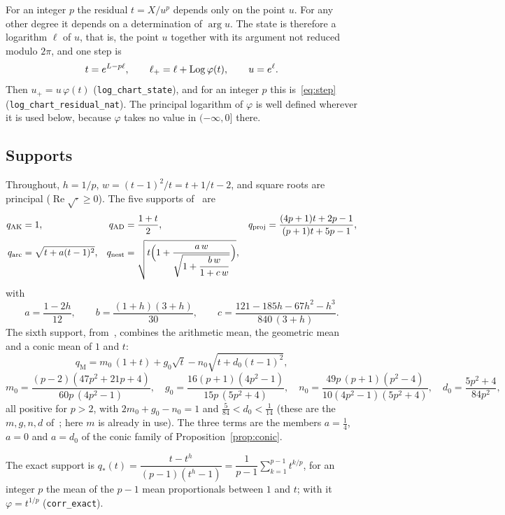 \documentclass[10pt,a4paper]{article}
\theoremstyle{plain}
\theoremstyle{remark}
\numberwithin{equation}{section}
\DeclareMathOperator{\re}{Re}\DeclareMathOperator{\im}{Im}
\newcommand{\lean}[1]{\texttt{#1}}
\begin{document}
For an integer $p$ the residual $t=X/u^{p}$ depends only on the point $u$. For any other degree it
depends on a determination of $\arg u$. The state is therefore a logarithm $\ell$ of $u$, that is,
the point $u$ together with its argument not reduced modulo $2\pi$, and one step is
\begin{equation}\label{eq:logstep}
  t=e^{L-p\ell},\qquad \ell_{+}=\ell+\operatorname{Log}\varphi(t),\qquad u=e^{\ell}.
\end{equation}
Then $u_+=u\,\varphi(t)$ (\lean{log\_chart\_state}), and for an integer $p$ this
is~\eqref{eq:step} (\lean{log\_chart\_residual\_nat}). The principal logarithm of $\varphi$ is
well defined wherever it is used below, because $\varphi$ takes no value in $(-\infty,0]$ there.

\subsection{Supports}

Throughout, $h=1/p$, $w=(t-1)^{2}/t=t+1/t-2$, and square roots are principal ($\re\sqrt{\cdot}\ge0$).
The five supports of~\cite{v28} are
\begin{align}
 q_{\mathrm{AK}}&=1, &
 q_{\mathrm{AD}}&=\frac{1+t}{2}, &
 q_{\mathrm{proj}}&=\frac{(4p+1)t+2p-1}{(p+1)t+5p-1},\notag\\
 q_{\mathrm{arc}}&=\sqrt{t+a(t-1)^{2}}, &
 q_{\mathrm{nest}}&=\sqrt{t\Bigl(1+\frac{a\,w}{\sqrt{1+\dfrac{b\,w}{1+c\,w}}}\Bigr)},\label{eq:supports}
\end{align}
with
\[
 a=\frac{1-2h}{12},\qquad b=\frac{(1+h)(3+h)}{30},\qquad
 c=\frac{121-185h-67h^{2}-h^{3}}{840\,(3+h)} .
\]
The sixth support, from~\cite{v29}, combines the arithmetic mean, the geometric mean and a conic
mean of $1$ and $t$:
\begin{equation}\label{eq:qM}
 q_{\mathrm M}=m_0\,(1+t)+g_0\sqrt t-n_0\sqrt{t+d_0(t-1)^{2}},
\end{equation}
\[
 m_0=\frac{(p-2)(47p^{2}+21p+4)}{60p\,(4p^{2}-1)},\quad
 g_0=\frac{16(p+1)(4p^{2}-1)}{15p\,(5p^{2}+4)},\quad
 n_0=\frac{49p\,(p+1)(p^{2}-4)}{10(4p^{2}-1)(5p^{2}+4)},\quad
 d_0=\frac{5p^{2}+4}{84p^{2}},
\]
all positive for $p>2$, with $2m_0+g_0-n_0=1$ and $\frac5{84}<d_0<\frac1{14}$ (these are the
$m,g,n,d$ of~\cite{v29}; here $m$ is already in use). The three terms are the members
$a=\frac14$, $a=0$ and $a=d_0$ of the conic family of Proposition~\ref{prop:conic}.

The exact support is $q_*(t)=\dfrac{t-t^{h}}{(p-1)(t^{h}-1)}=\dfrac1{p-1}\sum_{k=1}^{p-1}t^{k/p}$,
for an integer $p$ the mean of the $p-1$ mean proportionals between $1$ and $t$; with it $\varphi=t^{1/p}$
(\lean{corr\_exact}).
\end{document}
